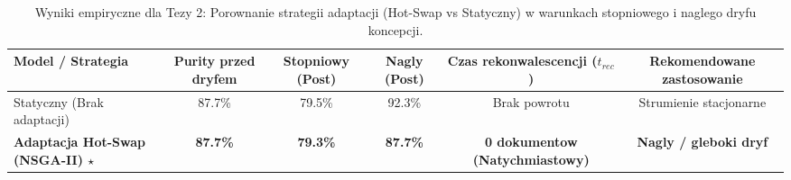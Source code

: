 \begin{table}[htbp]
\centering
\caption{Wyniki empiryczne dla Tezy 2: Porownanie strategii adaptacji (Hot-Swap vs Statyczny) w warunkach stopniowego i naglego dryfu koncepcji.}
\label{tab:thesis_2_drift_results}
\begin{tabular}{lccccc}
\toprule
\textbf{Model / Strategia} & \textbf{Purity przed dryfem} & \textbf{Stopniowy (Post)} & \textbf{Nagly (Post)} & \textbf{Czas rekonwalescencji ($t_{rec}$)} & \textbf{Rekomendowane zastosowanie} \\
\midrule
Statyczny (Brak adaptacji) & 87.7\% & 79.5\% & 92.3\% & Brak powrotu & Strumienie stacjonarne \\
\textbf{Adaptacja Hot-Swap (NSGA-II) $\star$} & \textbf{87.7\%} & \textbf{79.3\%} & \textbf{87.7\%} & \textbf{0 dokumentow (Natychmiastowy)} & \textbf{Nagly / gleboki dryf} \\
\bottomrule
\end{tabular}
\end{table}